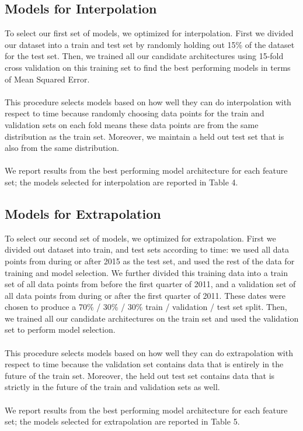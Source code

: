 \documentclass{article}
\begin{document}
\subsection{Models for Interpolation}
To select our first set of models, we optimized for interpolation. First we divided our dataset into a train and test set by randomly holding out 15\% of the dataset for the test set. Then, we trained all our candidate architectures using 15-fold cross validation on this training set to find the best performing models in terms of Mean Squared Error.\\\\
This procedure selects models based on how well they can do interpolation with respect to time because randomly choosing data points for the train and validation sets on each fold means these data points are from the same distribution as the train set. Moreover, we maintain a held out test set that is also from the same distribution.\\\\
We report results from the best performing model architecture for each feature set; the models selected for interpolation are reported in Table 4.

\subsection{Models for Extrapolation}

To select our second set of models, we optimized for extrapolation. First we divided out dataset into train, and test sets according to time: we used all data points from during or after 2015 as the test set, and used the rest of the data for training and model selection. We further divided this training data into a train set of all data points from before the first quarter of 2011, and a validation set of all data points from during or after the first quarter of 2011. These dates were chosen to produce a 70\% / 30\% / 30\% train / validation  / test set split. Then, we trained all our candidate architectures on the train set and used the validation set to perform model selection.\\\\
This procedure selects models based on how well they can do extrapolation with respect to time because the validation set contains data that is entirely in the future of the train set. Moreover, the held out test set contains data that is strictly in the future of the train and validation sets as well.\\\\
We report results from the best performing model architecture for each feature set; the models selected for extrapolation are reported in Table 5.
\end{document}
